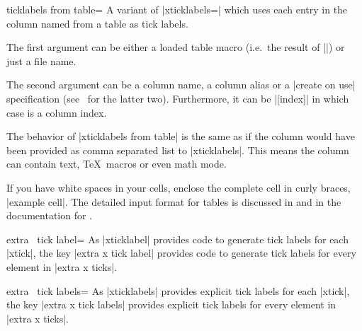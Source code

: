 \begin{pgfplotsxykey}{\x ticklabels from table=}
	A variant of |xticklabels=| which uses each entry in the column named  from a table as tick labels.

	The first argument  can be either a loaded table macro (i.e.\ the result of |\pgfplotstableread|) or just a file name.

	The second argument can be a column name, a column alias or a |create on use| specification (see \PGFPlotstable\ for the latter two). Furthermore, it can be |[index]| in which case  is a column index.

	The behavior of |xticklabels from table| is the same as if the column  would have been provided as comma separated list to |xticklabels|. This means the column can contain text, \TeX\ macros or even math mode.

	If you have white spaces in your cells, enclose the complete cell in curly braces, |{example cell}|. The detailed input format for tables is discussed in  and in the documentation for \PGFPlotstable.
\end{pgfplotsxykey}

\begin{pgfplotsxykey}{extra \x\ tick label=}
	As |xticklabel| provides code to generate tick labels for each |xtick|, the key |extra x tick label| provides code to generate tick labels for every element in |extra x ticks|.
\end{pgfplotsxykey}

\begin{pgfplotsxykey}{extra \x\ tick labels=}
	As |xticklabels| provides explicit tick labels for each |xtick|, the key |extra x tick labels| provides explicit tick labels for every element in |extra x ticks|.
\end{pgfplotsxykey}



